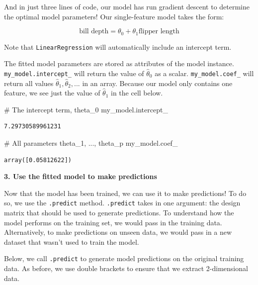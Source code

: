 \documentclass[
  letterpaper,
  DIV=11,
  numbers=noendperiod]{scrreprt}
\newenvironment{Shaded}{\begin{snugshade}}{\end{snugshade}}
\newcommand{\CommentTok}[1]{\textcolor[rgb]{0.37,0.37,0.37}{#1}}
\newcommand{\NormalTok}[1]{\textcolor[rgb]{0.00,0.23,0.31}{#1}}
\begin{document}
And in just three lines of code, our model has run gradient descent to
determine the optimal model parameters! Our single-feature model takes
the form:

\[\text{bill depth} = \theta_0 + \theta_1 \text{flipper length}\]

Note that \texttt{LinearRegression} will automatically include an
intercept term.

The fitted model parameters are stored as attributes of the model
instance. \texttt{my\_model.intercept\_} will return the value of
\(\hat{\theta}_0\) as a scalar. \texttt{my\_model.coef\_} will return
all values \(\hat{\theta}_1,
\hat{\theta}_2, ...\) in an array. Because our model only contains one
feature, we see just the value of \(\hat{\theta}_1\) in the cell below.

\begin{Shaded}
\begin{Highlighting}[]
\CommentTok{\# The intercept term, theta\_0}
\NormalTok{my\_model.intercept\_}
\end{Highlighting}
\end{Shaded}

\begin{verbatim}
7.29730589961231
\end{verbatim}

\begin{Shaded}
\begin{Highlighting}[]
\CommentTok{\# All parameters theta\_1, ..., theta\_p}
\NormalTok{my\_model.coef\_}
\end{Highlighting}
\end{Shaded}

\begin{verbatim}
array([0.05812622])
\end{verbatim}

\textbf{3. Use the fitted model to make predictions}

Now that the model has been trained, we can use it to make predictions!
To do so, we use the \texttt{.predict} method. \texttt{.predict} takes
in one argument: the design matrix that should be used to generate
predictions. To understand how the model performs on the training set,
we would pass in the training data. Alternatively, to make predictions
on unseen data, we would pass in a new dataset that wasn't used to train
the model.

Below, we call \texttt{.predict} to generate model predictions on the
original training data. As before, we use double brackets to ensure that
we extract 2-dimensional data.
\end{document}
